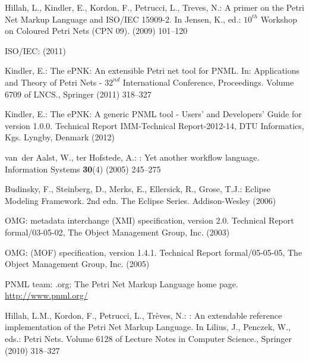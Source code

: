 \begin{thebibliography}{10}

Hillah, L., Kindler, E., Kordon, F., Petrucci, L., Treves, N.:
\newblock A primer on the {Petri Net Markup Language} and {ISO/IEC 15909-2}.
\newblock In Jensen, K., ed.: $10^{th}$ Workshop on Coloured Petri Nets (CPN
  09). (2009)  101--120

ISO/IEC:
 (2011)

Kindler, E.:
\newblock The {ePNK}: {An} extensible {Petri} net tool for {PNML}.
\newblock In: Applications and Theory of Petri Nets - $32^{nd}$ International
  Conference, Proceedings. Volume 6709 of LNCS., Springer (2011)  318--327

Kindler, E.:
\newblock The {ePNK}: A generic {PNML} tool - {Users' and Developers' Guide}
  for version 1.0.0.
\newblock Technical Report IMM-Technical Report-2012-14, DTU Informatics, Kgs.
  Lyngby, Denmark (2012)

van~der Aalst, W., ter Hofstede, A.:
: Yet another workflow language.
\newblock Information Systems \textbf{30}(4) (2005)  245--275

Budinsky, F., Steinberg, D., Merks, E., Ellersick, R., Grose, T.J.:
\newblock Eclipse Modeling Framework. 2nd edn.
\newblock The Eclipse Series. Addison-Wesley (2006)

{OMG}:
 metadata interchange ({XMI}) specification, version 2.0.
\newblock Technical Report formal/03-05-02, The Object Management Group, Inc.
  (2003)

{OMG}:
 ({MOF}) specification, version 1.4.1.
\newblock Technical Report formal/05-05-05, The Object Management Group, Inc.
  (2005)

{PNML team}:
.org: The {Petri Net Markup Language} home page.
\newblock \url{http://www.pnml.org/}

Hillah, L.M., Kordon, F., Petrucci, L., Tr{\`e}ves, N.:
: An extendable reference implementation of the
  {Petri Net Markup Language}.
\newblock In Lilius, J., Penczek, W., eds.: Petri Nets. Volume 6128 of Lecture
  Notes in Computer Science., Springer (2010)  318--327


\end{thebibliography}
